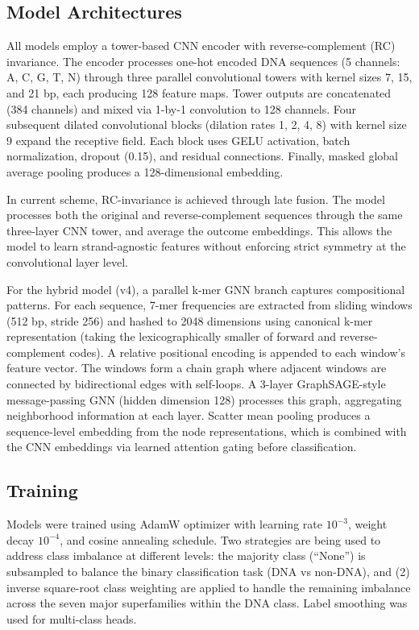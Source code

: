 \documentclass[12pt]{article}
\begin{document}
\subsection{Model Architectures}

All models employ a tower-based CNN encoder with reverse-complement (RC) invariance. The encoder processes one-hot encoded DNA sequences (5 channels: A, C, G, T, N) through three parallel convolutional towers with kernel sizes 7, 15, and 21 bp, each producing 128 feature maps. Tower outputs are concatenated (384 channels) and mixed via 1-by-1 convolution to 128 channels. Four subsequent dilated convolutional blocks (dilation rates 1, 2, 4, 8) with kernel size 9 expand the receptive field. Each block uses GELU activation, batch normalization, dropout (0.15), and residual connections. Finally, masked global average pooling produces a 128-dimensional embedding.

In current scheme, RC-invariance is achieved through late fusion. The model processes both the original and reverse-complement sequences through the same three-layer CNN tower, and average the outcome embeddings. This allows the model to learn strand-agnostic features without enforcing strict symmetry at the convolutional layer level. 

For the hybrid model (v4), a parallel k-mer GNN branch captures compositional patterns. For each sequence, 7-mer frequencies are extracted from sliding windows (512 bp, stride 256) and hashed to 2048 dimensions using canonical k-mer representation (taking the lexicographically smaller of forward and reverse-complement codes). A relative positional encoding is appended to each window's feature vector. The windows form a chain graph where adjacent windows are connected by bidirectional edges with self-loops. A 3-layer GraphSAGE-style message-passing GNN (hidden dimension 128) processes this graph, aggregating neighborhood information at each layer. Scatter mean pooling produces a sequence-level embedding from the node representations, which is combined with the CNN embeddings via learned attention gating before classification.

\subsection{Training}

Models were trained using AdamW optimizer with learning rate $10^{-3}$, weight decay $10^{-4}$, and cosine annealing schedule. Two strategies are being used to address class imbalance at different levels: the majority class (``None'') is subsampled to balance the binary classification task (DNA vs non-DNA), and (2) inverse square-root class weighting are applied to handle the remaining imbalance across the seven major superfamilies within the DNA class. Label smoothing was used for multi-class heads. 
\end{document}
